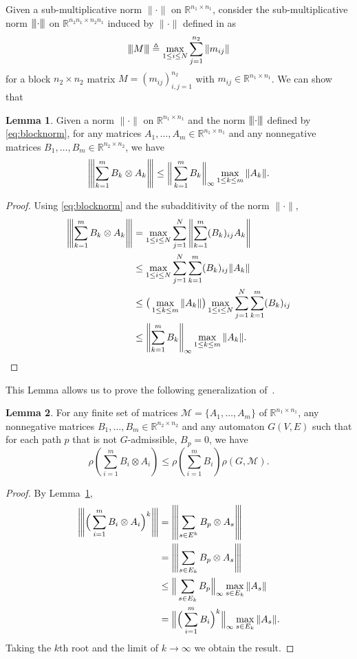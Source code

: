\documentclass{sig-alternate-05-2015}
\newcommand{\vertiii}[1]{{\left\vert\kern-0.25ex\left\vert\kern-0.25ex\left\vert #1
    \right\vert\kern-0.25ex\right\vert\kern-0.25ex\right\vert}}
\newcommand{\1}{\mathbf{1}}
\theoremstyle{definition}
\newtheorem{mylemm}{Lemma}
\newcommand{\R}{\mathbb{R}}
\newcommand{\A}{\mathcal{M}}
\newcommand{\G}{G}
\newcommand{\eqdef}{\triangleq}
\newcommand{\Nodes}{V}
\newcommand{\Arcs}{E}
\begin{document}
Given a sub-multiplicative norm $\|\cdot\|$ on $\R^{n_1 \times n_1}$,
consider the sub-multiplicative norm $\vertiii{\cdot}$ on $\R^{n_2n_1 \times n_2n_1}$ induced by $\|\cdot\|$ defined in \cite{kozyakin2014berger} as
\begin{equation}
  \label{eq:blocknorm}
  \vertiii{M} \eqdef \max_{1 \leq i \leq N} \sum_{j=1}^{n_2} \|m_{ij}\|
\end{equation}
for a block $n_2 \times n_2$ matrix $M = (m_{ij})_{i,j=1}^{n_2}$ with $m_{ij} \in \R^{n_1 \times n_1}$.
We can show that
\begin{mylemm}
  \label{lemm:cs}
  Given a norm $\|\cdot\|$ on $\R^{n_1 \times n_1}$ and the norm $\vertiii{\cdot}$ defined by \eqref{eq:blocknorm},
  for any matrices $A_1, \ldots, A_m \in \R^{n_1 \times n_1}$ and any nonnegative matrices $B_1, \ldots, B_m \in \R^{n_2 \times n_2}$,
  we have
  \[
    \vertiii{\sum_{k=1}^m B_k \otimes A_k}
    \leq \bigg\|\sum_{k=1}^m B_k\bigg\|_\infty \max_{1 \leq k \leq m} \|A_k\|.
  \]
  \begin{proof}
    Using \eqref{eq:blocknorm} and the subadditivity of the norm $\|\cdot\|$,
    \begin{align*}
      \vertiii{\sum_{k=1}^m B_k \otimes A_k}
      & = \max_{1 \leq i \leq N} \sum_{j=1}^N \left\|\sum_{k=1}^m (B_k)_{ij} A_k\right\|\\
      & \leq \max_{1 \leq i \leq N} \sum_{j=1}^N \sum_{k=1}^m (B_k)_{ij} \|A_k\|\\
      & \leq \big(\max_{1 \leq k \leq m} \|A_k\|\big) \max_{1 \leq i \leq N} \sum_{j=1}^N \sum_{k=1}^m (B_k)_{ij}\\
      & \leq \left\|\sum_{k=1}^m B_k\right\|_\infty \max_{1 \leq k \leq m} \|A_k\|.
    \end{align*}
  \end{proof}
\end{mylemm}

This Lemma allows us to prove the following generalization of~\cite[Lemma~1]{blondel2005computationally}.
\begin{mylemm}
  \label{lemm:srsjsr}
  For any finite set of matrices $\A = \{A_1, \ldots, A_m\}$ of $\R^{n_1 \times n_1}$, any nonnegative matrices $B_1, \ldots, B_m \in \R^{n_2 \times n_2}$ and any automaton $\G(\Nodes,\Arcs)$ such that for each path $p$ that is not $\G$-admissible, $B_p = 0$,
  we have
  \[
    \rho(\sum_{i=1}^m B_i \otimes A_i) \leq \rho(\sum_{i=1}^m B_i) \rho(\G, \A).
  \]
  \begin{proof}
    By Lemma~\ref{lemm:cs},
    \begin{align*}
      \vertiii{\Big(\sum_{i=1}^m B_i \otimes A_i\Big)^k}
      & = \vertiii{\sum_{s \in \Arcs^k} B_p \otimes A_s}\\
      & = \vertiii{\sum_{s \in \Arcs_k} B_p \otimes A_s}\\
      & \leq \Big\|\sum_{s \in \Arcs_k} B_p\Big\|_\infty \max_{s \in \Arcs_k} \|A_s\|\\
      & = \Big\|\Big(\sum_{i=1}^m B_i\Big)^k\Big\|_\infty \max_{s \in \Arcs_k} \|A_s\|.
    \end{align*}
    Taking the $k$th root and the limit of $k \to \infty$ we obtain the result.
  \end{proof}
\end{mylemm}
\end{document}
